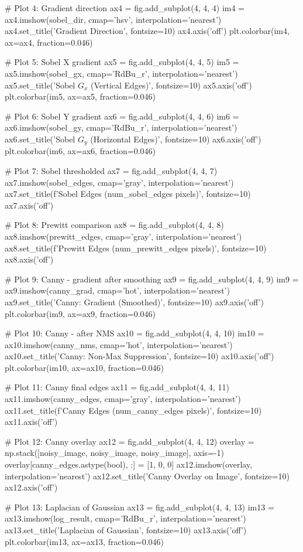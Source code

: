\documentclass[a4paper, 11pt]{article}
\begin{document}
\begin{pycode}
# Plot 4: Gradient direction
ax4 = fig.add_subplot(4, 4, 4)
im4 = ax4.imshow(sobel_dir, cmap='hsv', interpolation='nearest')
ax4.set_title('Gradient Direction', fontsize=10)
ax4.axis('off')
plt.colorbar(im4, ax=ax4, fraction=0.046)

# Plot 5: Sobel X gradient
ax5 = fig.add_subplot(4, 4, 5)
im5 = ax5.imshow(sobel_gx, cmap='RdBu_r', interpolation='nearest')
ax5.set_title('Sobel $G_x$ (Vertical Edges)', fontsize=10)
ax5.axis('off')
plt.colorbar(im5, ax=ax5, fraction=0.046)

# Plot 6: Sobel Y gradient
ax6 = fig.add_subplot(4, 4, 6)
im6 = ax6.imshow(sobel_gy, cmap='RdBu_r', interpolation='nearest')
ax6.set_title('Sobel $G_y$ (Horizontal Edges)', fontsize=10)
ax6.axis('off')
plt.colorbar(im6, ax=ax6, fraction=0.046)

# Plot 7: Sobel thresholded
ax7 = fig.add_subplot(4, 4, 7)
ax7.imshow(sobel_edges, cmap='gray', interpolation='nearest')
ax7.set_title(f'Sobel Edges ({num_sobel_edges} pixels)', fontsize=10)
ax7.axis('off')

# Plot 8: Prewitt comparison
ax8 = fig.add_subplot(4, 4, 8)
ax8.imshow(prewitt_edges, cmap='gray', interpolation='nearest')
ax8.set_title(f'Prewitt Edges ({num_prewitt_edges} pixels)', fontsize=10)
ax8.axis('off')

# Plot 9: Canny - gradient after smoothing
ax9 = fig.add_subplot(4, 4, 9)
im9 = ax9.imshow(canny_grad, cmap='hot', interpolation='nearest')
ax9.set_title('Canny: Gradient (Smoothed)', fontsize=10)
ax9.axis('off')
plt.colorbar(im9, ax=ax9, fraction=0.046)

# Plot 10: Canny - after NMS
ax10 = fig.add_subplot(4, 4, 10)
im10 = ax10.imshow(canny_nms, cmap='hot', interpolation='nearest')
ax10.set_title('Canny: Non-Max Suppression', fontsize=10)
ax10.axis('off')
plt.colorbar(im10, ax=ax10, fraction=0.046)

# Plot 11: Canny final edges
ax11 = fig.add_subplot(4, 4, 11)
ax11.imshow(canny_edges, cmap='gray', interpolation='nearest')
ax11.set_title(f'Canny Edges ({num_canny_edges} pixels)', fontsize=10)
ax11.axis('off')

# Plot 12: Canny overlay
ax12 = fig.add_subplot(4, 4, 12)
overlay = np.stack([noisy_image, noisy_image, noisy_image], axis=-1)
overlay[canny_edges.astype(bool), :] = [1, 0, 0]
ax12.imshow(overlay, interpolation='nearest')
ax12.set_title('Canny Overlay on Image', fontsize=10)
ax12.axis('off')

# Plot 13: Laplacian of Gaussian
ax13 = fig.add_subplot(4, 4, 13)
im13 = ax13.imshow(log_result, cmap='RdBu_r', interpolation='nearest')
ax13.set_title('Laplacian of Gaussian', fontsize=10)
ax13.axis('off')
plt.colorbar(im13, ax=ax13, fraction=0.046)


\end{pycode}
\end{document}
